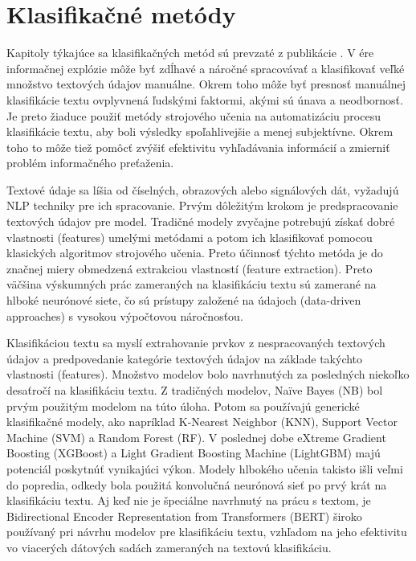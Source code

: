 \section{Klasifikačné metódy}
Kapitoly týkajúce sa klasifikačných metód sú prevzaté z publikácie \cite{Li:2021}. V ére informačnej explózie môže byť zdĺhavé a náročné spracovávať a klasifikovať veľké množstvo textových údajov manuálne. Okrem toho môže byť presnosť manuálnej klasifikácie textu ovplyvnená ľudskými faktormi, akými sú únava a neodbornosť. Je preto žiaduce použiť metódy strojového učenia na automatizáciu procesu klasifikácie textu, aby boli výsledky spoľahlivejšie a menej subjektívne. Okrem toho to môže tiež pomôcť zvýšiť efektivitu vyhľadávania informácií a zmierniť problém informačného preťaženia.

Textové údaje sa líšia od číselných, obrazových alebo signálových dát, vyžadujú NLP   techniky pre ich spracovanie. Prvým dôležitým krokom je predspracovanie textových údajov
pre model. Tradičné modely zvyčajne potrebujú získať dobré vlastnosti (features) umelými metódami a potom ich klasifikovať pomocou klasických algoritmov strojového učenia. Preto účinnosť týchto metóda je do značnej miery obmedzená extrakciou vlastností (feature extraction). Preto väčšina výskumných prác zameraných na klasifikáciu textu sú zamerané na hlboké neurónové siete, čo sú prístupy založené na údajoch (data-driven approaches) s vysokou výpočtovou náročnosťou.

Klasifikáciou textu sa myslí extrahovanie prvkov z nespracovaných textových údajov a predpovedanie kategórie textových údajov na základe takýchto vlastnosti (features). Množstvo modelov bolo navrhnutých za posledných niekoľko desaťročí na klasifikáciu textu. Z tradičných modelov, Naïve Bayes (NB) bol prvým použitým modelom na túto úloha. Potom sa používajú generické klasifikačné modely, ako napríklad K-Nearest Neighbor (KNN), Support Vector Machine (SVM) a Random Forest (RF). V poslednej dobe eXtreme Gradient Boosting (XGBoost) a Light Gradient Boosting Machine (LightGBM) majú potenciál poskytnúť vynikajúci výkon. Modely hlbokého učenia takisto išli veľmi do popredia, odkedy bola použitá konvolučná neurónová sieť po prvý krát na klasifikáciu textu. Aj keď nie je špeciálne navrhnutý na prácu s textom, je Bidirectional Encoder Representation from Transformers (BERT) široko používaný pri návrhu modelov pre klasifikáciu textu, vzhľadom na jeho efektivitu vo viacerých dátových sadách zameraných na textovú klasifikáciu.

